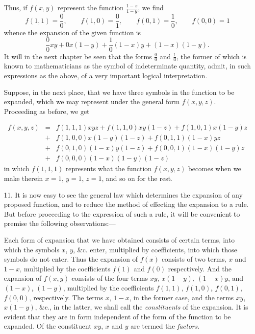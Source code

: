 \documentclass[oneside]{book}
\begin{document}
Thus, if $f\left(x, y\right)$ represent the function $\frac{1-x}{1-y}$, we find
\[
f\left(1, 1\right) = \frac{0}{0},\qquad%
f\left(1, 0\right) = \frac{0}{1},\qquad%
f\left(0, 1\right) = \frac{1}{0},\qquad%
f\left(0, 0\right) = 1
\]
whence the expansion of the given function is
\[
\frac{0}{0}xy + 0x\left(1-y\right) + \frac{1}{0}\left(1-x\right)y + \left(1-x\right)\left(1-y\right).
\]
It will in the next chapter be seen that the forms $\frac{0}{0}$ and $\frac{1}{0}$, the
former of which is known to mathematicians as the symbol of indeterminate
quantity, admit, in such expressions as the above, of
a very important logical interpretation.

Suppose, in the next place, that we have three symbols in
the function to be expanded, which we may represent under the
general form $f\left(x, y, z\right)$. Proceeding as before, we get

\begin{eqnarray*}
f\left(x,y,z\right) &=& f\left(1,1,1\right)xyz + f\left(1,1,0\right)xy\left(1-z\right) + f\left(1, 0, 1\right)x\left(1-y\right)z\\
         &+& f\left(1,0,0\right)x\left(1-y\right)\left(1-z\right) + f\left(0,1,1\right)\left(1-x\right)yz\\
         &+& f\left(0,1,0\right)\left(1-x\right)y\left(1-z\right) + f\left(0,0,1\right)\left(1-x\right)\left(1-y\right)z\\
         &+& f\left(0,0,0\right)\left(1-x\right)\left(1-y\right)\left(1-z\right)
\end{eqnarray*}
in which $f\left(1, 1, 1\right)$ represents what the function $f\left(x, y, z\right)$ becomes
when we make therein $x = 1$, $y = 1$, $z = 1$, and so on for
the rest.

11. It is now easy to see the general law which determines
the expansion of any proposed function, and to reduce the method
of effecting the expansion to a rule. But before proceeding
to the expression of such a rule, it will be convenient to premise
the following observations:---

Each form of expansion that we have obtained consists of certain
terms, into which the symbols $x$, $y$, \&c. enter, multiplied by
coefficients, into which those symbols do not enter. Thus the
expansion of $f\left(x\right)$ consists of two terms, $x$ and $1 - x$, multiplied
by the coefficients $f\left(1\right)$ and $f\left(0\right)$ respectively. And the expansion
of $f\left(x, y\right)$ consists of the four terms $xy$, $x\left(1 - y\right)$, $\left(1 - x\right)y$,
and $\left(1 - x\right)$, $\left(1 - y\right)$, multiplied by the coefficients $f\left(1, 1\right)$, $f\left(1, 0\right)$,
$f\left(0, 1\right)$, $f\left(0, 0\right)$, respectively. The terms $x$, $1 - x$, in the former
case, and the terms $xy$, $x\left(1 - y\right)$, \&c., in the latter, we shall call
the \textit{constituents} of the expansion. It is evident that they are in
form independent of the form of the function to be expanded.
Of the constituent $xy$, $x$ and $y$ are termed the \textit{factors}.
\end{document}
